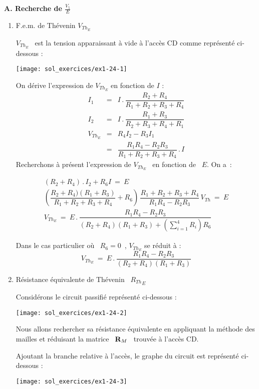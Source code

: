 {\bf A. Recherche de  $\frac{V_5}{E}$}

\begin{enumerate}
\item F.e.m. de Thévenin  $V_{{Th}_E}$

$V_{{Th}_E}$ \ est la tension apparaissant à vide à l'accès CD comme représenté ci-dessous : 
\begin{center} 
\texttt{[image: sol\_exercices/ex1-24-1]}
\end{center} 

On dérive l'expression de $V_{{Th}_E}$ en fonction de $I$ :
\[\begin{array}{rcl}
I_1 &=& I\, . \, \dfrac{R_2+R_4}{R_1+R_2+R_3+R_4} \\
I_2 &=& I \, . \,\dfrac{R_1+R_3}{R_2+R_3+R_4+R_1} \\
V_{{Th}_E} &=& R_4I_2 - R_3I_1\\
&=& \dfrac{R_1R_4 -R_2R_3}{R_1+R_2+R_3+R_4} \, . \, I 
\end{array}\] 
Recherchons à présent l'expression de $V_{{Th}_E}$ \ en fonction de \ $E$. On a~:

\[ \begin{array}{c} 
(R_2+R_4)\, . \, I_2 + R_6I \: = \: E\\ 
\left(
\dfrac{R_2+R_4)(R_1+R_3)}{R_1+R_2+R_3+R_4} + R_6 \right) 
\, \dfrac{R_1+R_2+R_3+R_4}{R_1R_4
- R_2R_3} \, V_{Th} \: = \: E \\
V_{{Th}_E} \: = \: E \, . \, \dfrac{R_1R_4 -R_2R_3}{(R_2+R_4)(R_1+R_3) + 
\left( \sum^4_{i=1} R_i\right) R_6} 
\end{array} \]

Dans le cas particulier où \ $R_6=0$~, $V_{{Th}_E}$ se réduit à :
\[ V_{{Th}_E} \: = \: E \,. \, \dfrac{R_1R_4 - R_2R_3}{(R_2+R_4)(R_1+R_3)} \]

\item Résistance équivalente de Thévenin \ ${R_{Th}}_E$

Considérons le circuit passifié représenté ci-dessous : 
\begin{center} 
\texttt{[image: sol\_exercices/ex1-24-2]}
\end{center} 

Nous allons rechercher sa résistance équivalente en appliquant la méthode des mailles et
réduisant la matrice \ ${\bf R}_M$ \ trouvée à l'accès CD.

Ajoutant la branche relative à l'accès, le graphe du circuit est représenté ci-dessous :
\begin{center} 
\texttt{[image: sol\_exercices/ex1-24-3]}
\end{center} 


\end{enumerate}
